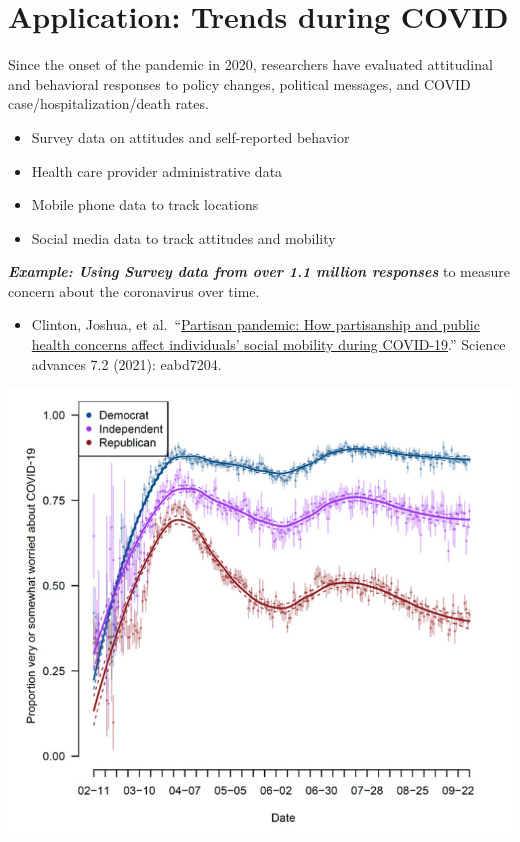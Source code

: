\documentclass[
  letterpaper,
  DIV=11,
  numbers=noendperiod]{scrreprt}
\providecommand{\tightlist}{%
  \setlength{\itemsep}{0pt}\setlength{\parskip}{0pt}}\usepackage{longtable,booktabs,array}
\begin{document}
\hypertarget{application-trends-during-covid}{%
\section{Application: Trends during
COVID}\label{application-trends-during-covid}}

Since the onset of the pandemic in 2020, researchers have evaluated
attitudinal and behavioral responses to policy changes, political
messages, and COVID case/hospitalization/death rates.

\begin{itemize}
\tightlist
\item
  Survey data on attitudes and self-reported behavior
\item
  Health care provider administrative data
\item
  Mobile phone data to track locations
\item
  Social media data to track attitudes and mobility
\end{itemize}

\textbf{\emph{Example: Using Survey data from over 1.1 million
responses}} to measure concern about the coronavirus over time.

\begin{itemize}
\tightlist
\item
  Clinton, Joshua, et
  al.~``\href{https://www.science.org/doi/10.1126/sciadv.abd7204}{Partisan
  pandemic: How partisanship and public health concerns affect
  individuals' social mobility during COVID-19}.'' Science advances 7.2
  (2021): eabd7204.
\end{itemize}

\includegraphics{images/covidsurvey.png}
\end{document}
